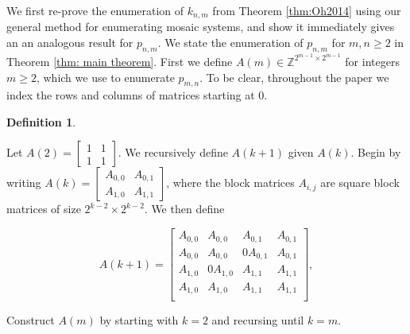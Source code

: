 \documentclass[12pt]{article}
\theoremstyle{plain}
\theoremstyle{definition}
\newtheorem{definition}{Definition}[section]
\theoremstyle{remark}
\theoremstyle{definition}
\newcommand{\cell}[4]{ \draw[thick] ( #1 , #2 ) rectangle ( #3 , #4 );}
\newcommand{\lablnode}[3]{\node[shape=circle,draw=none,fill=none, inner sep=0pt,minimum size=5pt] (A) at ( #1 , #2 ) {#3};}
\newcommand{\lablvertex}[3]{\node[shape=circle,draw=none,fill=white, inner sep=2pt,minimum size=5pt] (A) at ( #1 , #2 ) {#3};}
\begin{document}
\begin{center}
\end{center}


We first re-prove the enumeration of $k_{n,m}$ from Theorem \ref{thm:Oh2014} using our general method for enumerating mosaic systems, and show it immediately gives an an analogous result for $p_{n,m}$. We state the enumeration of $p_{n,m}$ for $m,n \geq 2$ in Theorem \ref{thm: main theorem}. First we define $A(m) \in \mathbb{Z}^{2^{m-1} \times 2^{m-1}}$ for integers $m \geq 2$, which we use to enumerate $p_{m,n}$. To be clear, throughout the paper we index the rows and columns of matrices starting at $0$.

\begin{definition}
\label{defn: A}

Let $A(2) = \begin{bmatrix}
1 & 1 \\
1 & 1
\end{bmatrix}
$. We recursively define $A(k+1)$ given $A(k)$. Begin by writing
$
A(k) = \begin{bmatrix}
A_{0,0} & A_{0,1} \\
A_{1,0} & A_{1,1}
\end{bmatrix}
$, where the block matrices $A_{i,j}$ are square block matrices of size $2^{k-2} \times 2^{k-2}$. We then define

$$
A(k+1) = \begin{bmatrix}
A_{0,0} & A_{0,0} & A_{0,1} & A_{0,1} \\
A_{0,0} & A_{0,0} & 0A_{0,1} & A_{0,1} \\
A_{1,0} & 0A_{1,0} & A_{1,1} & A_{1,1} \\
A_{1,0} & A_{1,0} & A_{1,1} & A_{1,1} \\
\end{bmatrix},
$$

Construct $A(m)$ by starting with $k=2$ and recursing until $k=m$. 

\end{definition}
\end{document}
